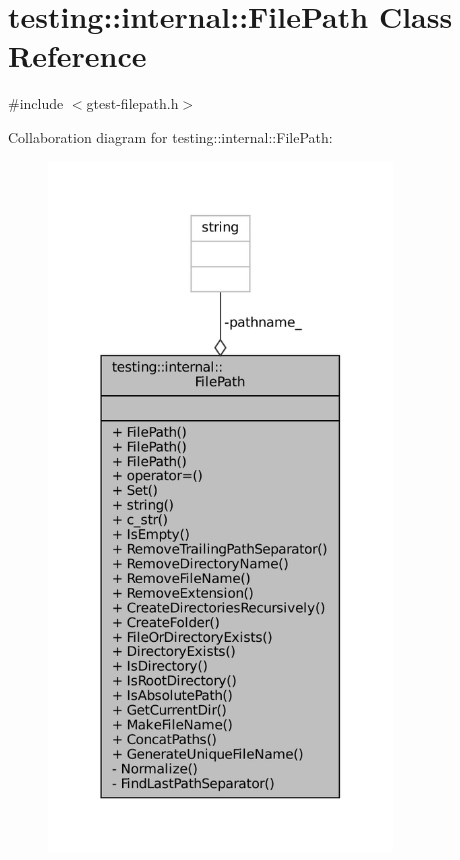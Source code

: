 \hypertarget{classtesting_1_1internal_1_1FilePath}{}\section{testing\+:\+:internal\+:\+:File\+Path Class Reference}
\label{classtesting_1_1internal_1_1FilePath}


{\ttfamily \#include $<$gtest-\/filepath.\+h$>$}



Collaboration diagram for testing\+:\+:internal\+:\+:File\+Path\+:
\nopagebreak
\begin{figure}[H]
\begin{center}
\leavevmode
\includegraphics[width=259pt]{classtesting_1_1internal_1_1FilePath__coll__graph}
\end{center}
\end{figure}
